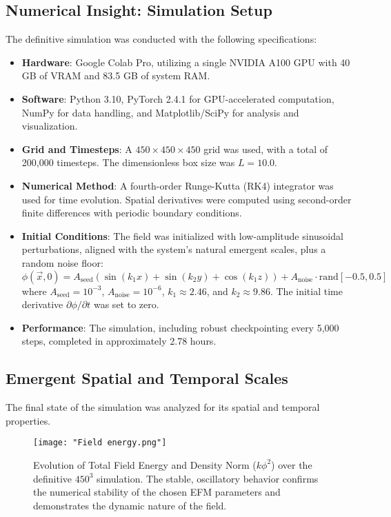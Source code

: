 \documentclass[11pt]{article}
\begin{document}
\subsection{Numerical Insight: Simulation Setup}
The definitive simulation was conducted with the following specifications:
\begin{itemize}
    \item \textbf{Hardware}: Google Colab Pro, utilizing a single NVIDIA A100 GPU with 40 GB of VRAM and 83.5 GB of system RAM.
    \item \textbf{Software}: Python 3.10, PyTorch 2.4.1 for GPU-accelerated computation, NumPy for data handling, and Matplotlib/SciPy for analysis and visualization.
    \item \textbf{Grid and Timesteps}: A \(450 \times 450 \times 450\) grid was used, with a total of 200,000 timesteps. The dimensionless box size was \(L=10.0\).
    \item \textbf{Numerical Method}: A fourth-order Runge-Kutta (RK4) integrator was used for time evolution. Spatial derivatives were computed using second-order finite differences with periodic boundary conditions.
    \item \textbf{Initial Conditions}: The field was initialized with low-amplitude sinusoidal perturbations, aligned with the system's natural emergent scales, plus a random noise floor:
    \begin{equation}
    \phi(\vec{x}, 0) = A_{\text{seed}} \left( \sin(k_1 x) + \sin(k_2 y) + \cos(k_1 z) \right) + A_{\text{noise}} \cdot \text{rand}[-0.5, 0.5]
    \end{equation}
    where \(A_{\text{seed}}=10^{-3}\), \(A_{\text{noise}}=10^{-6}\), \(k_1 \approx 2.46\), and \(k_2 \approx 9.86\). The initial time derivative \(\partial\phi/\partial t\) was set to zero.
    \item \textbf{Performance}: The simulation, including robust checkpointing every 5,000 steps, completed in approximately 2.78 hours.
\end{itemize}

\subsection{Emergent Spatial and Temporal Scales}
The final state of the simulation was analyzed for its spatial and temporal properties.

\begin{figure}[htbp]
\centering
\texttt{[image: "Field energy.png"]}
\caption{Evolution of Total Field Energy and Density Norm (\(k\phi^2\)) over the definitive \(450^3\) simulation. The stable, oscillatory behavior confirms the numerical stability of the chosen EFM parameters and demonstrates the dynamic nature of the field.}
\label{fig:energy_evolution}
\end{figure}
\end{document}
